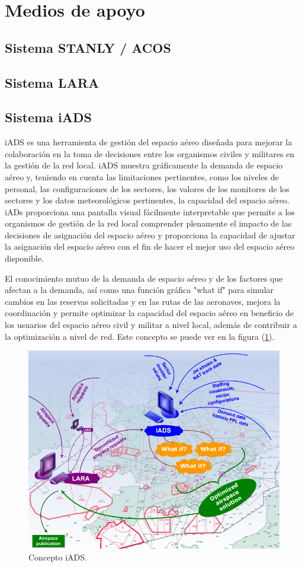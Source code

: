 \section{Medios de apoyo}

\subsection{Sistema STANLY / ACOS}

\subsection{Sistema LARA}

\subsection{Sistema iADS}

iADS es una herramienta de gestión del espacio aéreo diseñada para mejorar la colaboración en la toma de decisiones entre los organismos civiles y militares en la gestión de la red local. iADS muestra gráficamente la demanda de espacio aéreo y, teniendo en cuenta las limitaciones pertinentes, como los niveles de personal, las configuraciones de los sectores, los valores de los monitores de los sectores y los datos meteorológicos pertinentes, la capacidad del espacio aéreo. iADs proporciona una pantalla visual fácilmente interpretable que permite a los organismos de gestión de la red local comprender plenamente el impacto de las decisiones de asignación del espacio aéreo y proporciona la capacidad de ajustar la asignación del espacio aéreo con el fin de hacer el mejor uso del espacio aéreo disponible.

El conocimiento mutuo de la demanda de espacio aéreo y de los factores que afectan a la demanda, así como una función gráfica "what if" para simular cambios en las reservas solicitadas y en las rutas de las aeronaves, mejora la coordinación y permite optimizar la capacidad del espacio aéreo en beneficio de los usuarios del espacio aéreo civil y militar a nivel local, además de contribuir a la optimización a nivel de red. Este concepto se puede ver en la figura (\ref{fig:iads}).

\begin{figure}[H]
    \centering
    \includegraphics[width=0.7\linewidth]{figuras/iads.png}
    \caption{Concepto iADS.}
    \label{fig:iads}
\end{figure}

